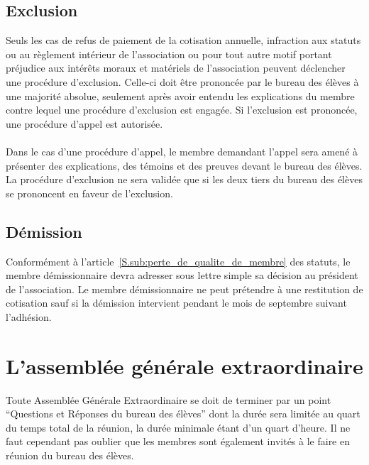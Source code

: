 \documentclass{article} %
\begin{document}
		\subsection{Exclusion}
\label{sub:exclusion}

			Seuls les cas de refus de paiement de la cotisation annuelle,
			infraction aux statuts ou au règlement intérieur de l'association ou
			pour tout autre motif portant préjudice aux intérêts moraux et
			matériels de l’association peuvent déclencher une procédure
			d’exclusion. Celle-ci doit être prononcée par le bureau des élèves à
			une majorité absolue, seulement après avoir entendu les explications
			du membre contre lequel une procédure d’exclusion est engagée. Si
			l’exclusion est prononcée, une procédure d’appel est autorisée.

            \paragraph{}
			Dans le cas d’une procédure d’appel, le membre demandant l’appel
			sera amené à présenter des explications, des témoins et des preuves
			devant le bureau des élèves. La procédure d’exclusion ne sera
			validée que si les deux tiers du bureau des élèves se prononcent en
			faveur de l’exclusion.

		\subsection{Démission}
\label{sub:demission}

			Conformément à l'article~\ref{S.sub:perte_de_qualite_de_membre} des
			statuts, le membre démissionnaire devra adresser sous lettre simple
			sa décision au président de l’association. Le membre démissionnaire
			ne peut prétendre à une restitution de cotisation sauf si la
			démission intervient pendant le mois de septembre suivant l'adhésion.

	\section{L'assemblée générale extraordinaire}
\label{sec:l_assemblee_generale_extraordinaire}

		Toute Assemblée Générale Extraordinaire se doit de terminer par un point
		“Questions et Réponses du bureau des élèves” dont la durée sera limitée
		au quart du temps total de la réunion, la durée minimale étant d’un
		quart d’heure. Il ne faut cependant pas oublier que les membres sont
		également invités à le faire en réunion du bureau des élèves.
\end{document}
